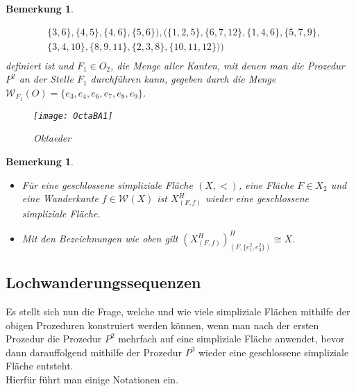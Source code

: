 \documentclass[12pt,titlepage,twoside,cleardoublepage]{article}
\theoremstyle{nummermitklammern}
\newtheorem{bemerkung}[temp]{Bemerkung}
\newtheorem{bemerkung}[zahl]{Bemerkung}
\numberwithin{equation}{section}
\begin{document}
\begin{bemerkung}
\begin{enumerate}
\begin{align*}
&\{ 3, 6 \},\{ 4, 5 \}, \{ 4, 6 \}, \{ 5, 6 \} ),(\{ 1, 2, 5 \}, \{ 6, 7, 12 \}, \{ 1, 4, 6 \}, \{ 5, 7, 9 \},\\
& \{3, 4, 10 \},\{ 8, 9, 11 \}, \{ 2, 3, 8 \}, \{ 10, 11, 12 \}))\\
\end{align*}
definiert ist und $F_1 \in O_2$, die Menge aller Kanten, mit denen man die Prozedur $P^2$ an der Stelle $F_1$ durchführen kann, gegeben durch die Menge $\mathcal{W}_{F_1}(O)=\{e_3,e_4,e_6,e_7,e_8,e_9\}$.
 \begin{figure}[H]
\begin{center}
\texttt{[image: OctaBA1]}
\end{center}
\caption{Oktaeder}
\end{figure}
 \end{enumerate}
\end{bemerkung}
\begin{bemerkung}
\begin{itemize} \label{beminv1}
\item Für eine geschlossene simpliziale Fläche $(X,<)$, eine Fläche $F \in X_2$ und eine Wanderkante $f \in \mathcal{W}(X)$ ist $X^H_{(F,f)}$ wieder eine geschlossene simpliziale Fläche.
\item Mit den Bezeichnungen wie oben gilt $(X^H_{(F,f)})^H_{(F,\{e_1^2,e_3^2\})}\cong X$.
\end{itemize}
\end{bemerkung}
\subsection{Lochwanderungssequenzen}
Es stellt sich nun die Frage, welche und wie viele simpliziale Flächen mithilfe der obigen Prozeduren konstruiert werden können, wenn man nach der ersten Prozedur die Prozedur $P^2$ mehrfach auf eine simpliziale Fläche anwendet, bevor dann darauffolgend mithilfe der Prozedur $P^3$ wieder eine geschlossene simpliziale Fläche entsteht.\\
Hierfür führt man einige Notationen ein.
\end{document}
